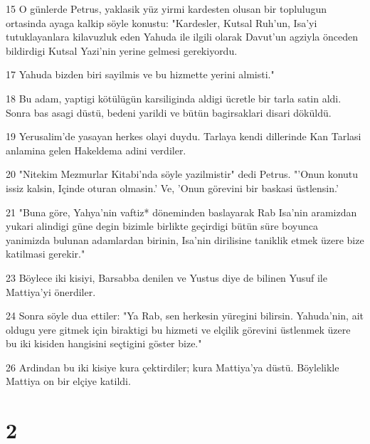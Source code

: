 \par 15 O günlerde Petrus, yaklasik yüz yirmi kardesten olusan bir toplulugun ortasinda ayaga kalkip söyle konustu: "Kardesler, Kutsal Ruh'un, Isa'yi tutuklayanlara kilavuzluk eden Yahuda ile ilgili olarak Davut'un agziyla önceden bildirdigi Kutsal Yazi'nin yerine gelmesi gerekiyordu.
\par 17 Yahuda bizden biri sayilmis ve bu hizmette yerini almisti."
\par 18 Bu adam, yaptigi kötülügün karsiliginda aldigi ücretle bir tarla satin aldi. Sonra bas asagi düstü, bedeni yarildi ve bütün bagirsaklari disari döküldü.
\par 19 Yerusalim'de yasayan herkes olayi duydu. Tarlaya kendi dillerinde Kan Tarlasi anlamina gelen Hakeldema adini verdiler.
\par 20 "Nitekim Mezmurlar Kitabi'nda söyle yazilmistir" dedi Petrus. "'Onun konutu issiz kalsin, Içinde oturan olmasin.' Ve, 'Onun görevini bir baskasi üstlensin.'
\par 21 "Buna göre, Yahya'nin vaftiz* döneminden baslayarak Rab Isa'nin aramizdan yukari alindigi güne degin bizimle birlikte geçirdigi bütün süre boyunca yanimizda bulunan adamlardan birinin, Isa'nin dirilisine taniklik etmek üzere bize katilmasi gerekir."
\par 23 Böylece iki kisiyi, Barsabba denilen ve Yustus diye de bilinen Yusuf ile Mattiya'yi önerdiler.
\par 24 Sonra söyle dua ettiler: "Ya Rab, sen herkesin yüregini bilirsin. Yahuda'nin, ait oldugu yere gitmek için biraktigi bu hizmeti ve elçilik görevini üstlenmek üzere bu iki kisiden hangisini seçtigini göster bize."
\par 26 Ardindan bu iki kisiye kura çektirdiler; kura Mattiya'ya düstü. Böylelikle Mattiya on bir elçiye katildi.

\chapter{2}

